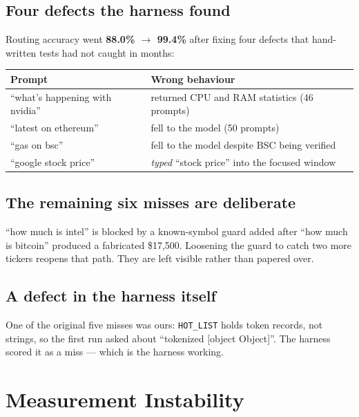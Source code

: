 \documentclass[10pt,twocolumn]{article}
\newcommand{\code}[1]{\texttt{\small #1}}
\begin{document}
\subsection{Four defects the harness found}

Routing accuracy went \textbf{88.0\% $\to$ 99.4\%} after fixing four defects that
hand-written tests had not caught in months:

\begin{table}[h]
\centering\small
\begin{tabular}{@{}lp{3.4cm}@{}}
\toprule
\textbf{Prompt} & \textbf{Wrong behaviour} \\
\midrule
``what's happening with nvidia'' & returned CPU and RAM statistics (46 prompts) \\
``latest on ethereum'' & fell to the model (50 prompts) \\
``gas on bsc'' & fell to the model despite BSC being verified \\
``google stock price'' & \emph{typed} ``stock price'' into the focused window \\
\bottomrule
\end{tabular}
\end{table}

\subsection{The remaining six misses are deliberate}

``how much is intel'' is blocked by a known-symbol guard added after ``how much is
bitcoin'' produced a fabricated \$17{,}500. Loosening the guard to catch two more tickers
reopens that path. They are left visible rather than papered over.

\subsection{A defect in the harness itself}

One of the original five misses was ours: \code{HOT\_LIST} holds token records, not
strings, so the first run asked about ``tokenized [object Object]''. The harness scored it
as a miss --- which is the harness working.

\section{Measurement Instability}
\label{sec:instab}
\end{document}
